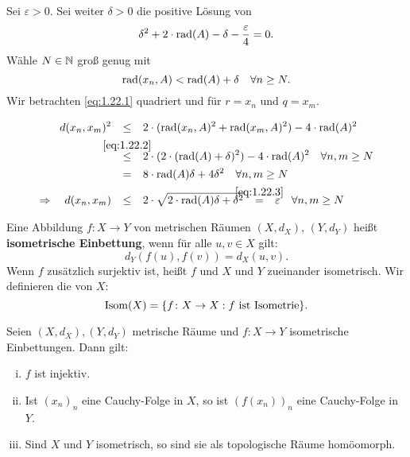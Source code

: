 \begin{beweis}
	Sei $\varepsilon > 0$.
	Sei weiter $\delta > 0$ die positive Lösung von 
	\begin{equation}
		\delta^2 + 2 \cdot \operatorname{rad}(A) - \delta - \frac{\varepsilon}{4} = 0. \label{eq:1.22.3}
	\end{equation}
	Wähle $N \in \mathbb{N}$ groß genug mit
	\begin{equation}
		\operatorname{rad}(x_n,A) < \operatorname{rad}(A) + \delta \quad \forall n \geq N. \label{eq:1.22.2}
	\end{equation}
	Wir betrachten \eqref{eq:1.22.1} quadriert und für $r = x_n$ und $q = x_m$.
	
	\begin{align*}
		d(x_n,x_m)^2 &\stack{}{\leq} 2 \cdot (\rad(x_n,A)^2 + \rad(x_m,A)^2) - 4 \cdot \rad(A)^2 \\
		&\stack{\eqref{eq:1.22.2}}{\leq} 2 \cdot (2 \cdot (\rad(A) + \delta)^2)-4 \cdot \rad(A)^2 \quad \forall n,m \geq N \\
		&\stack{}{=} 8 \cdot \rad(A) \delta + 4 \delta^2 \quad \forall n,m \geq N \\
		\Rightarrow \quad d(x_n,x_m) &\stack{}{\leq} 2 \cdot \sqrt{2 \cdot \rad(A) \delta + \delta^2} \stack{\eqref{eq:1.22.3}}{=} \varepsilon \quad \forall n,m \geq N 
	\end{align*}
\end{beweis}

\begin{definition}[Isometrie]
\label{def:1.23}
	Eine Abbildung $f \colon X \rightarrow Y$ von metrischen Räumen $(X,d_X)$, $(Y,d_Y)$ heißt \textbf{isometrische Einbettung}, wenn für alle $u,v \in X$ gilt:
	\[
		d_Y(f(u),f(v)) = d_X(u,v).
	\]
	Wenn $f$ zusätzlich surjektiv ist, heißt $f$  und $X$ und $Y$ zueinander isometrisch. Wir definieren die  von $X$:
	\[
		\operatorname{Isom}(X) = \{f \colon X \rightarrow X : f \text{ ist Isometrie}\}.
	\]
\end{definition}

\begin{bemerkung}
\label{bem:1.24}
	Seien $(X,d_X), (Y,d_Y)$ metrische Räume und $f \colon X \rightarrow Y$ isometrische Einbettungen. Dann gilt:
	\begin{enumerate}[(i)]
		\item $f$ ist injektiv.
		\item Ist $(x_n)_n$ eine Cauchy-Folge in $X$, so ist $(f(x_n))_n$ eine Cauchy-Folge in $Y$.
		\item Sind $X$ und $Y$ isometrisch, so sind sie als topologische Räume homöomorph.
	\end{enumerate}
\end{bemerkung}

